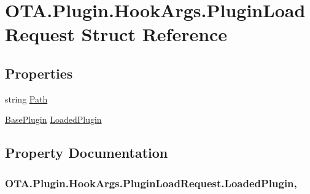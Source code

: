 \hypertarget{struct_o_t_a_1_1_plugin_1_1_hook_args_1_1_plugin_load_request}{}\section{O\+T\+A.\+Plugin.\+Hook\+Args.\+Plugin\+Load\+Request Struct Reference}
\label{struct_o_t_a_1_1_plugin_1_1_hook_args_1_1_plugin_load_request}
\subsection*{Properties}
\begin{DoxyCompactItemize}
\item 
string \hyperlink{struct_o_t_a_1_1_plugin_1_1_hook_args_1_1_plugin_load_request_a7e1897a0003060f73d166a3e4eb63508}{Path}
\item 
\hyperlink{class_o_t_a_1_1_plugin_1_1_base_plugin}{Base\+Plugin} \hyperlink{struct_o_t_a_1_1_plugin_1_1_hook_args_1_1_plugin_load_request_a3abbcd483b979feaf8e3d1d64e5b7a8a}{Loaded\+Plugin}
\end{DoxyCompactItemize}


\subsection{Property Documentation}
\hypertarget{struct_o_t_a_1_1_plugin_1_1_hook_args_1_1_plugin_load_request_a3abbcd483b979feaf8e3d1d64e5b7a8a}{}
\subsubsection[{Loaded\+Plugin}]{ O\+T\+A.\+Plugin.\+Hook\+Args.\+Plugin\+Load\+Request.\+Loaded\+Plugin\hspace{0.3cm}{\ttfamily [get]}, {\ttfamily [set]}}\label{struct_o_t_a_1_1_plugin_1_1_hook_args_1_1_plugin_load_request_a3abbcd483b979feaf8e3d1d64e5b7a8a}
\hypertarget{struct_o_t_a_1_1_plugin_1_1_hook_args_1_1_plugin_load_request_a7e1897a0003060f73d166a3e4eb63508}{}
